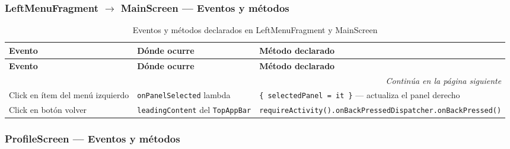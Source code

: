 \documentclass[stu, 12pt, letterpaper, donotrepeattitle, floatsintext, natbib]{apa7}
\begin{document}
\subsubsection{LeftMenuFragment $\rightarrow$ MainScreen --- Eventos y métodos}

\begin{longtable}{@{}p{3.2cm}p{3cm}p{9.3cm}@{}}
\caption{Eventos y métodos declarados en LeftMenuFragment y MainScreen}
\label{tab:evleftmenu}\\
\toprule
\textbf{Evento} & \textbf{Dónde ocurre} & \textbf{Método declarado} \\
\midrule
\endfirsthead
\toprule
\textbf{Evento} & \textbf{Dónde ocurre} & \textbf{Método declarado} \\
\midrule
\endhead
\midrule
\multicolumn{3}{r}{\small\textit{Continúa en la página siguiente}}\\
\endfoot
\bottomrule
\endlastfoot
Click en ítem del menú izquierdo & \texttt{onPanelSelected} lambda & \texttt{\{ selectedPanel = it \}} --- actualiza el panel derecho \\[3pt]
Click en botón volver & \texttt{leadingContent} del \texttt{TopAppBar} & \texttt{requireActivity().onBackPressedDispatcher.onBackPressed()} \\
\end{longtable}

\subsubsection{ProfileScreen --- Eventos y métodos}
\end{document}
